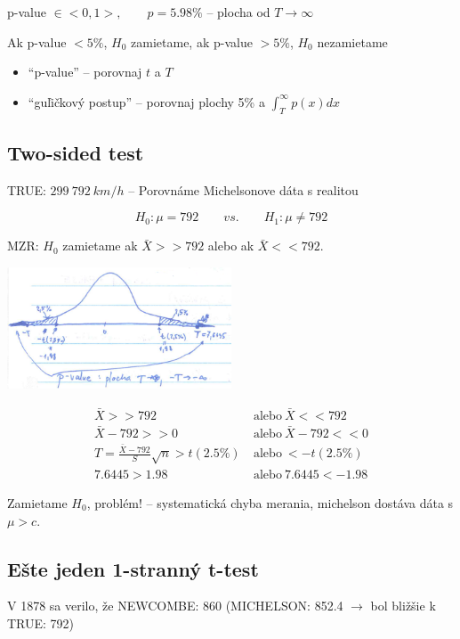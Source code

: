\documentclass[unknownkeysallowed]{article}
\begin{document}
p-value $\in <0,1>, \qquad p=5.98\%$ -- plocha od $T\to\infty$

Ak p-value $<5\%$, $H_0$ zamietame, ak p-value $>5\%$, $H_0$ nezamietame

\begin{itemize}
\item ``p-value'' -- porovnaj $t$ a $T$
\item ``guľičkový postup'' -- porovnaj plochy 5\% a $\int_T^{\infty}{p(x)dx}$
\end{itemize}

\subsection*{Two-sided test}
TRUE: $299~792~km/h$ -- Porovnáme Michelsonove dáta s realitou

$$H_0: \mu = 792 \qquad vs. \qquad H_1: \mu \neq 792$$

MZR: $H_0$ zamietame ak $\bar{X} >> 792$ alebo ak $\bar{X} << 792$.

\begin{multicols}{2}
\includegraphics[width=0.5\textwidth]{imgs/obr17.png}
\columnbreak

\begin{align*}
\bar{X} >> 792&\mathrm{~alebo~}\bar{X} << 792\\
\bar{X}-792 >> 0&\mathrm{~alebo~}\bar{X}-792 << 0\\
T = \frac{\bar{X}-792}{S}\sqrt{n} > t(2.5\%)&\mathrm{~alebo~}<-t(2.5\%)\\
7.6445 > 1.98&\mathrm{~alebo~}7.6445 < -1.98
\end{align*}

\end{multicols}

Zamietame $H_0$, problém! -- systematická chyba merania, michelson dostáva dáta s $\mu > c$.

\subsection*{Ešte jeden 1-stranný t-test}
V 1878 sa verilo, že NEWCOMBE: 860 \qquad (MICHELSON: 852.4 $\to$ bol bližšie k TRUE: 792)
\end{document}
